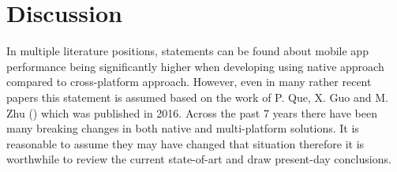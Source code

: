 
\chapter{Discussion}

In multiple literature positions, statements can be found about mobile app performance being significantly higher when developing using native approach compared to cross-platform approach. However, even in many rather recent papers this statement is assumed based on the work of P. Que, X. Guo and M. Zhu (\cite{que_comp_hybrid_native}) which was published in 2016. Across the past 7 years there have been many breaking changes in both native and multi-platform solutions. It is reasonable to assume they may have changed that situation therefore it is worthwhile to review the current state-of-art and draw present-day conclusions.
